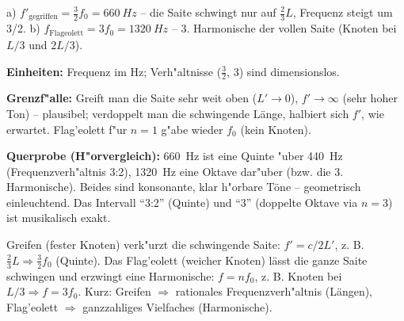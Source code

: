 \begin{ergebnis}
a) $f'_{\text{gegriffen}}=\frac32 f_0=\qty{660}{Hz}$ -- die Saite
schwingt nur auf $\tfrac23L$, Frequenz steigt um 3/2.
b) $f_{\text{Flageolett}}=3f_0=\qty{1320}{Hz}$ -- 3. Harmonische der vollen
Saite (Knoten bei $L/3$ und $2L/3$).
\end{ergebnis}

\begin{kontrolle}
\textbf{Einheiten:} Frequenz im \unit{\hertz}; Verh"altnisse
($\tfrac32$, $3$) sind dimensionslos. \checkmark

\textbf{Grenzf"alle:} Greift man die Saite sehr weit oben ($L'\to0$),
$f'\to\infty$ (sehr hoher Ton) -- plausibel; verdoppelt man die
schwingende Länge, halbiert sich $f'$, wie erwartet. Flag'eolett f"ur
$n=1$ g"abe wieder $f_0$ (kein Knoten). \checkmark

\textbf{Querprobe (H"orvergleich):} 660~Hz ist eine Quinte "uber 440~Hz
(Frequenzverh"altnis 3:2), 1320~Hz eine Oktave dar"uber (bzw. die 3.
Harmonische). Beides sind konsonante, klar h"orbare Töne -- geometrisch
einleuchtend. Das Intervall ``3:2'' (Quinte) und ``3'' (doppelte Oktave via
$n=3$) ist musikalisch exakt. \checkmark
\end{kontrolle}

\begin{merksatz}
Greifen (fester Knoten) verk"urzt die schwingende Saite: $f'=c/2L'$,
z. B. $\tfrac23L\Rightarrow\tfrac32 f_0$ (Quinte). Das Flag'eolett (weicher
Knoten) lässt die ganze Saite schwingen und erzwingt eine Harmonische:
$f=n f_0$, z. B. Knoten bei $L/3\Rightarrow f=3f_0$. Kurz: Greifen
$\Rightarrow$ rationales Frequenzverh"altnis (Längen), Flag'eolett
$\Rightarrow$ ganzzahliges Vielfaches (Harmonische).
\end{merksatz}
